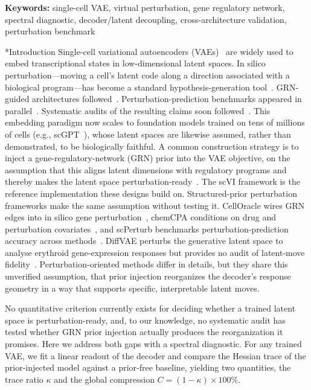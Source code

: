 \documentclass[11pt,a4paper]{article}
\makeatletter
\renewcommand{\section}{\@startsection{section}{1}{0pt}{12pt plus 6pt}{6pt}{\large\bfseries}}
\makeatother
\begin{document}
\textbf{Keywords:} single-cell VAE, virtual perturbation, gene regulatory network, spectral diagnostic, decoder/latent decoupling, cross-architecture validation, perturbation benchmark

\section*{Introduction}
Single-cell variational autoencoders (VAEs)~\cite{kingma2013,lopez2018,eraslan2019} are widely used to embed transcriptional states in low-dimensional latent spaces. In silico perturbation---moving a cell's latent code along a direction associated with a biological program---has become a standard hypothesis-generation tool~\cite{lotfollahi2019,lotfollahi2020trvae,hetzel2022}. GRN-guided architectures followed~\cite{kamimoto2023,roohani2024,lotfollahi2023}. Perturbation-prediction benchmarks appeared in parallel~\cite{wu2025,bereket2023,bunne2023}. Systematic audits of the resulting claims soon followed~\cite{baek2025,moinfar2024,lilixiang2026}. This embedding paradigm now scales to foundation models trained on tens of millions of cells (e.g., scGPT~\cite{cui2024}), whose latent spaces are likewise assumed, rather than demonstrated, to be biologically faithful. A common construction strategy is to inject a gene-regulatory-network (GRN) prior into the VAE objective, on the assumption that this aligns latent dimensions with regulatory programs and thereby makes the latent space perturbation-ready~\cite{kamimoto2023,vega,expimap2023}. The scVI framework \cite{lopez2018} is the reference implementation these designs build on. Structured-prior perturbation frameworks make the same assumption without testing it. CellOracle wires GRN edges into in silico gene perturbation~\cite{kamimoto2023}, chemCPA conditions on drug and perturbation covariates~\cite{hetzel2022}, and scPerturb benchmarks perturbation-prediction accuracy across methods~\cite{scperturb}. DiffVAE perturbs the generative latent space to analyse erythroid gene-expression responses but provides no audit of latent-move fidelity~\cite{diffvae}. Perturbation-oriented methods differ in details, but they share this unverified assumption, that prior injection reorganizes the decoder's response geometry in a way that supports specific, interpretable latent moves.

No quantitative criterion currently exists for deciding whether a trained latent space is perturbation-ready, and, to our knowledge, no systematic audit has tested whether GRN prior injection actually produces the reorganization it promises. Here we address both gaps with a spectral diagnostic. For any trained VAE, we fit a linear readout of the decoder and compare the Hessian trace of the prior-injected model against a prior-free baseline, yielding two quantities, the trace ratio $\kappa$ and the global compression $C=(1-\kappa)\times100\%$.
\end{document}
